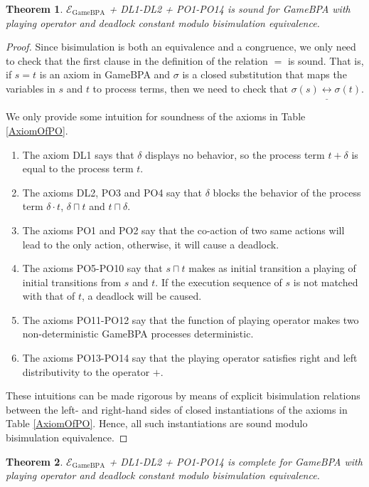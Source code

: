\documentclass{fac}
\newtheorem{theorem}{Theorem}[section]
\begin{document}
\begin{theorem}
$\mathcal{E}_{\textrm{GameBPA}}$ + DL1-DL2 + PO1-PO14  is sound for GameBPA with playing operator and deadlock constant modulo bisimulation equivalence.
\end{theorem}

\begin{proof}
Since bisimulation is both an equivalence and a congruence, we only need to check that the first clause in the definition of the relation $=$ is sound.
That is, if $s=t$ is an axiom in GameBPA and $\sigma$ is a closed substitution that maps the variables in $s$ and $t$ to process terms, then we need to check that $\sigma(s)\underline{\leftrightarrow}\sigma(t)$.

We only provide some intuition for soundness of the axioms in Table \ref{AxiomOfPO}.

\begin{enumerate}
  \item The axiom DL1 says that $\delta$ displays no behavior, so the process term $t + \delta$ is equal to the process term $t$.
  \item The axioms DL2, PO3 and PO4 say that $\delta$ blocks the behavior of the process term $\delta \cdot t$, $\delta \sqcap t$ and $t \sqcap \delta$.
  \item The axioms PO1 and PO2 say that the co-action of two same actions will lead to the only action, otherwise, it will cause a deadlock.
  \item The axioms PO5-PO10 say that $s\sqcap t$ makes as initial transition a playing of initial transitions from $s$ and $t$. If the execution sequence of $s$ is not matched with that of $t$, a deadlock will be caused.
  \item The axioms PO11-PO12 say that the function of playing operator makes two non-deterministic GameBPA processes deterministic.
  \item The axioms PO13-PO14 say that the playing operator satisfies right and left distributivity to the operator $+$.
\end{enumerate}

These intuitions can be made rigorous by means of explicit bisimulation relations between the left- and right-hand sides of closed instantiations of the axioms in Table \ref{AxiomOfPO}. Hence, all such instantiations are sound modulo bisimulation equivalence.
\end{proof}

\begin{theorem}
$\mathcal{E}_{\textrm{GameBPA}}$ + DL1-DL2 + PO1-PO14 is complete for GameBPA with playing operator and deadlock constant modulo bisimulation equivalence.
\end{theorem}
\end{document}
